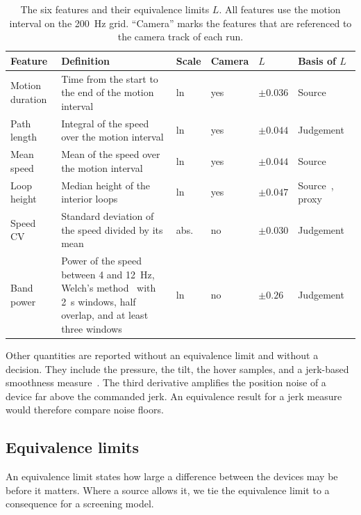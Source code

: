 \begin{table}[t]
\centering
\caption{The six features and their equivalence limits $L$.
All features use the motion interval on the 200~Hz grid.
``Camera'' marks the features that are referenced to the camera track of each run.}
\label{tab:features}
\small\begin{tabular}{@{}p{2.2cm}p{5.6cm}llll@{}}
\toprule
Feature & Definition & Scale & Camera & $L$ & Basis of $L$ \\
\midrule
Motion duration & Time from the start to the end of the motion interval & ln & yes & $\pm0.036$ & Source~\cite{Gerth2016b} \\
Path length & Integral of the speed over the motion interval & ln & yes & $\pm0.044$ & Judgement \\
Mean speed & Mean of the speed over the motion interval & ln & yes & $\pm0.044$ & Source~\cite{Gerth2016b} \\
Loop height & Median height of the interior loops & ln & yes & $\pm0.047$ & Source~\cite{Bisio2016}, proxy \\
Speed CV & Standard deviation of the speed divided by its mean & abs. & no & $\pm0.030$ & Judgement \\
Band power & Power of the speed between 4 and 12~Hz, Welch's method~\cite{Welch1967} with 2~s windows, half overlap, and at least three windows & ln & no & $\pm0.26$ & Judgement~\cite{Elble2017} \\
\bottomrule
\end{tabular}
\end{table}

Other quantities are reported without an equivalence limit and without a decision.
They include the pressure, the tilt, the hover samples, and a jerk-based smoothness measure~\cite{Balasubramanian2015}.
The third derivative amplifies the position noise of a device far above the commanded jerk.
An equivalence result for a jerk measure would therefore compare noise floors.

\subsection{Equivalence limits}
\label{sec:limits}
An equivalence limit states how large a difference between the devices may be before it matters.
Where a source allows it, we tie the equivalence limit to a consequence for a screening model.

